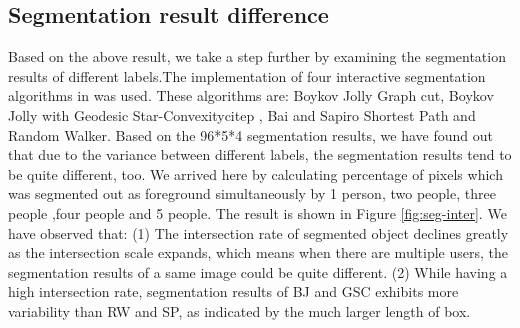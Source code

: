 \documentclass[runningheads,a4paper]{llncs}
\begin{document}
\subsection{Segmentation result difference}
Based on the above result, we take a step further by examining the segmentation results of different labels.The implementation of four interactive segmentation algorithms in \cite{gulshan2010geodesic} was used. These algorithms are: Boykov Jolly Graph cut\cite{boykov2001interactive},  Boykov Jolly with Geodesic Star-Convexitycitep\cite{gulshan2010geodesic} , Bai and Sapiro Shortest Path\cite{bai2007geodesic} and Random Walker\cite{grady2006random}. Based on the 96*5*4 segmentation results, we have found out that due to the variance between different labels, the segmentation results tend to be quite different, too.  We arrived here by calculating percentage of pixels which was segmented out as foreground simultaneously by 1 person, two people, three people ,four people and 5 people. The result is shown in Figure \ref{fig:seg-inter}. We have observed that: (1) The intersection rate of segmented object declines greatly as the intersection scale expands, which means when there are multiple users, the segmentation results of a same image could be quite different. (2) While having a high intersection rate, segmentation results of BJ and GSC exhibits more variability than RW and SP, as indicated by the much larger length of box.

\end{document}
